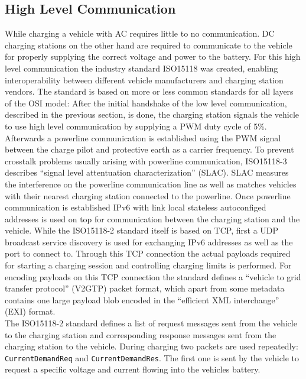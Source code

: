 \documentclass[conference,flushend]{iaria} %
\begin{document}
\subsection{High Level Communication}
While charging a vehicle with AC requires little to no communication.
DC charging stations on the other hand are required to communicate to the vehicle for properly supplying the correct voltage and power to the battery.
For this high level communication the industry standard ISO15118 \cite{isoiec_isoiec_2012} was created, enabling interoperability between different vehicle manufacturers and charging station vendors.
The standard is based on more or less common standards for all layers of the OSI model:
After the initial handshake of the low level communication, described in the previous section, is done, the charging station signals the vehicle to use high level communication by supplying a PWM duty cycle of 5\%.
Afterwards a powerline communication is established using the PWM signal between the charge pilot and protective earth as a carrier frequency.
To prevent crosstalk problems \cite{li_crosstalk_2019, theethayi_parameters_2003, ngo_bisse_crosstalk_2023} usually arising with powerline communication, ISO15118-3 \cite{isoiec_isoiec_2012-1} describes \enquote{signal level attentuation characterization} (SLAC).
SLAC measures the interference on the powerline communication line as well as matches vehicles with their nearest charging station connected to the powerline.
Once powerline communication is established IPv6 with link local stateless autoconfiged addresses is used on top for communication between the charging station and the vehicle.
While the ISO15118-2 standard \cite{isoiec_isoiec_2012} itself is based on TCP, first a UDP broadcast service discovery is used for exchanging IPv6 addresses as well as the port to connect to.
Through this TCP connection the actual payloads required for starting a charging session and controlling charging limits is performed.
For encoding payloads on this TCP connection the standard defines a \enquote{vehicle to grid transfer protocol} (V2GTP) packet format, which apart from some metadata contains one large payload blob encoded in the \enquote{efficient XML interchange} (EXI) format. \\
The ISO15118-2 standard defines a list of request messages sent from the vehicle to the charging station and corresponding response messages sent from the charging station to the vehicle.
During charging two packets are used repeatedly: \verb'CurrentDemandReq' and \verb'CurrentDemandRes'.
The first one is sent by the vehicle to request a specific voltage and current flowing into the vehicles battery.
\end{document}

